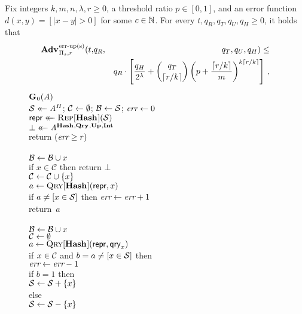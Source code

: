 \begin{theorem}\label{thm:count-ms-bound}
Fix integers $k, m, n, \lambda, r\geq 0$, a threshold ratio $p \in [0,1]$, and
an error function $d(x,y) = [|x - y| > 0]$ for some $c \in \mathbb{N}$.
  For every $t, q_R, q_T, q_U, q_H \geq 0$, it holds that
  \begin{eqnarray*}
    \Adv{\erreps}_{\struct_s,r}(t,&q_R,& q_T, q_U, q_H) \leq \\ && q_R \cdot \left[\frac{q_H}{2^\lambda} + \binom{q_T}{\lceil r/k \rceil}\left(p+\frac{\lceil r/k \rceil}{m}\right)^{k\lceil r/k \rceil}\right] \,,
\end{eqnarray*}
\end{theorem}

\begin{figure*}
  {
    \underline{$\mathbf{G}\hspace{0.5pt}_0(\mathit{A})$}\\[2pt]
      $\mathcal{S} \mathrel{\leftarrow\mkern-14mu\leftarrow} \mathit{A}^H$; $\mathcal{C} \gets \emptyset$; $\mathcal{B} \gets \mathcal{S}$; $\textit{err} \gets 0$\\
      $\mathsf{repr} \mathrel{\leftarrow\mkern-14mu\leftarrow} \textsc{Rep}[\mathbf{Hash}\hspace{0.5pt}](\mathcal{S})$\\
      $\bot \mathrel{\leftarrow\mkern-14mu\leftarrow} \mathit{A}^{\mathbf{Hash}\hspace{0.5pt},\mathbf{Qry}\hspace{0.5pt},\mathbf{Up}\hspace{0.5pt},\mathbf{Int}\hspace{0.5pt}}$\\
      return $(\textit{err} \geq r)$
    \\[6pt]
    \\[2pt]
      $\mathcal{B} \gets \mathcal{B} \cup x$\\
      if $x \in \mathcal{C}$ then return $\bot$\\
      $\mathcal{C} \gets \mathcal{C} \cup \{x\}$\\
      $a \gets \textsc{Qry}[\mathbf{Hash}\hspace{0.5pt}](\mathsf{repr}, x)$\\
      if $a \neq [x \in \mathcal{S}]$ then $\textit{err} \gets \textit{err} + 1$\\
      return~$a$
    \\[6pt]
    \\[2pt]
      $\mathcal{B} \gets \mathcal{B} \cup x$\\
      $\mathcal{C} \gets \emptyset$\\
      $a \gets \textsc{Qry}[\mathbf{Hash}\hspace{0.5pt}](\mathsf{repr}, \mathsf{qry}_x)$\\
      if $x \in \mathcal{C}$ and $b = a \neq [x \in \mathcal{S}]$ then\\
      \tab $\textit{err} \gets \textit{err}-1$\\
      if $b = 1$ then\\
      \tab $\mathcal{S} \gets \mathcal{S} + \{x\}$\\
      else\\
      \tab $\mathcal{S} \gets \mathcal{S} - \{x\}$\\
}
\end{figure*}
